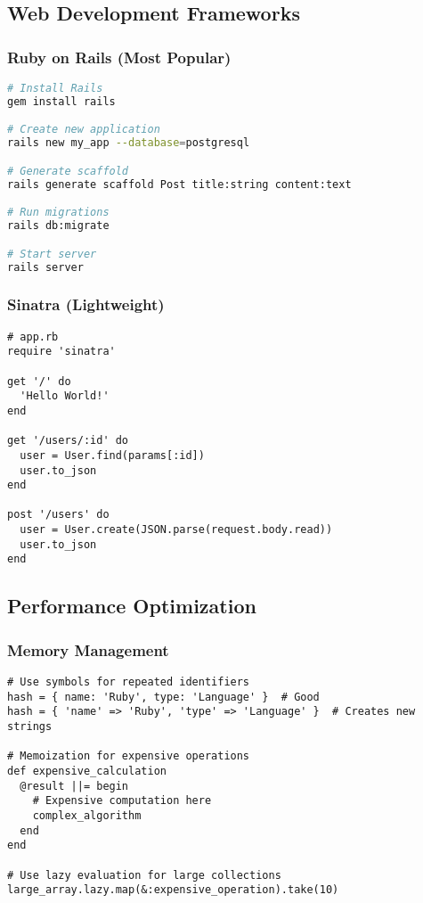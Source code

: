 \documentclass[12pt,a4paper]{article}
\begin{document}
\subsection{Web Development Frameworks}

\subsubsection{Ruby on Rails (Most Popular)}

\begin{lstlisting}[language=bash]
# Install Rails
gem install rails

# Create new application
rails new my_app --database=postgresql

# Generate scaffold
rails generate scaffold Post title:string content:text

# Run migrations
rails db:migrate

# Start server
rails server
\end{lstlisting}

\subsubsection{Sinatra (Lightweight)}

\begin{lstlisting}
# app.rb
require 'sinatra'

get '/' do
  'Hello World!'
end

get '/users/:id' do
  user = User.find(params[:id])
  user.to_json
end

post '/users' do
  user = User.create(JSON.parse(request.body.read))
  user.to_json
end
\end{lstlisting}

\subsection{Performance Optimization}

\subsubsection{Memory Management}

\begin{lstlisting}
# Use symbols for repeated identifiers
hash = { name: 'Ruby', type: 'Language' }  # Good
hash = { 'name' => 'Ruby', 'type' => 'Language' }  # Creates new strings

# Memoization for expensive operations
def expensive_calculation
  @result ||= begin
    # Expensive computation here
    complex_algorithm
  end
end

# Use lazy evaluation for large collections
large_array.lazy.map(&:expensive_operation).take(10)
\end{lstlisting}
\end{document}
